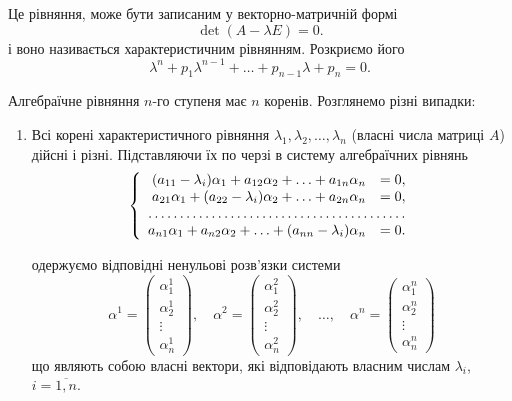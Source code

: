 Це рівняння, може бути записаним у векторно-матричній формі
\begin{equation*}
	\det(A - \lambda E) = 0.
\end{equation*}
і воно називається характеристичним рівнянням. Розкриємо його
\begin{equation*}
	\lambda^n + p_1 \lambda^{n - 1} + \ldots + p_{n - 1} \lambda + p_n = 0.
\end{equation*}

Алгебраїчне рівняння $n$-го ступеня має $n$ коренів. Розглянемо різні випадки:
\begin{enumerate}
\item Всі корені характеристичного рівняння $\lambda_1, \lambda_2, \ldots, \lambda_n$ (власні числа матриці $A$) дійсні і різні. Підставляючи їх по черзі в систему алгебраїчних рівнянь
\begin{equation*}
	\left\{
		\begin{array}{rl}
			(a_{11} - \lambda_i) \alpha_1 + a_{12} \alpha_2 + \ldots + a_{1n} \alpha_n &= 0, \\
			a_{21} \alpha_1 + (a_{22} - \lambda_i) \alpha_2 + \ldots + a_{2n} \alpha_n &= 0, \\
			\hdotsfor{2} \\
			a_{n1} \alpha_1 + a_{n2} \alpha_2 + \ldots + (a_{nn} - \lambda_i) \alpha_n &= 0.
		\end{array}
	\right.
\end{equation*}

одержуємо відповідні ненульові розв'язки системи
\begin{equation*}
	\alpha^1 = \begin{pmatrix} \alpha_1^1 \\ \alpha_2^1 \\ \vdots \\ \alpha_n^1 \end{pmatrix}, \quad
	\alpha^2 = \begin{pmatrix} \alpha_1^2 \\ \alpha_2^2 \\ \vdots \\ \alpha_n^2 \end{pmatrix}, \quad
	\ldots, \quad
	\alpha^n = \begin{pmatrix} \alpha_1^n \\ \alpha_2^n \\ \vdots \\ \alpha_n^n \end{pmatrix}
\end{equation*}
що являють собою власні вектори, які відповідають власним числам $\lambda_i$, $i = \overline{1, n}$. \parvskip


\end{enumerate}

